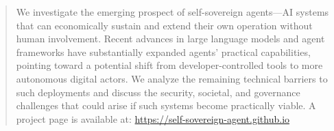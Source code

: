 \documentclass{article}
\theoremstyle{plain}
\theoremstyle{definition}
\theoremstyle{remark}
\begin{document}
\begin{abstract}


We investigate the emerging prospect of self-sovereign agents—AI systems that can economically sustain and extend their own operation without human involvement.
Recent advances in large language models and agent frameworks have substantially expanded agents’ practical capabilities, pointing toward a potential shift from developer-controlled tools to more autonomous digital actors. We analyze the remaining technical barriers to such deployments and discuss the security, societal, and governance challenges that could arise if such systems become practically viable. A project page is available at: \url{https://self-sovereign-agent.github.io}



\end{abstract}

















%









\end{document}

